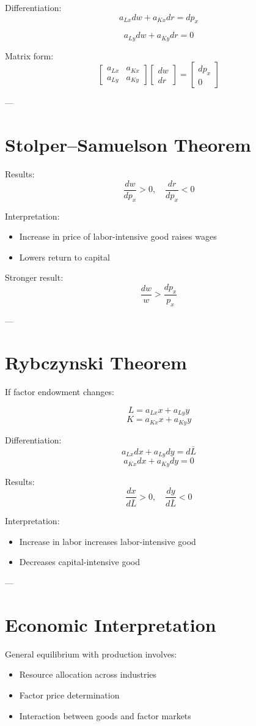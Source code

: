 Differentiation:
\[
a_{Lx} dw + a_{Kx} dr = dp_x
\]

\[
a_{Ly} dw + a_{Ky} dr = 0
\]

Matrix form:
\[
\begin{bmatrix}
a_{Lx} & a_{Kx} \\
a_{Ly} & a_{Ky}
\end{bmatrix}
\begin{bmatrix}
dw \\
dr
\end{bmatrix}
=
\begin{bmatrix}
dp_x \\
0
\end{bmatrix}
\]

---

\section{Stolper--Samuelson Theorem}

Results:
\[
\frac{dw}{dp_x} > 0, \quad
\frac{dr}{dp_x} < 0
\]

Interpretation:
\begin{itemize}
    \item Increase in price of labor-intensive good raises wages
    \item Lowers return to capital
\end{itemize}

Stronger result:
\[
\frac{dw}{w} > \frac{dp_x}{p_x}
\]

---

\section{Rybczynski Theorem}

If factor endowment changes:

\[
L = a_{Lx} x + a_{Ly} y
\]
\[
K = a_{Kx} x + a_{Ky} y
\]

Differentiation:
\[
a_{Lx} dx + a_{Ly} dy = d\bar{L}
\]
\[
a_{Kx} dx + a_{Ky} dy = 0
\]

Results:
\[
\frac{dx}{d\bar{L}} > 0, \quad
\frac{dy}{d\bar{L}} < 0
\]

Interpretation:
\begin{itemize}
    \item Increase in labor increases labor-intensive good
    \item Decreases capital-intensive good
\end{itemize}

---

\section{Economic Interpretation}

General equilibrium with production involves:
\begin{itemize}
    \item Resource allocation across industries
    \item Factor price determination
    \item Interaction between goods and factor markets
\end{itemize}